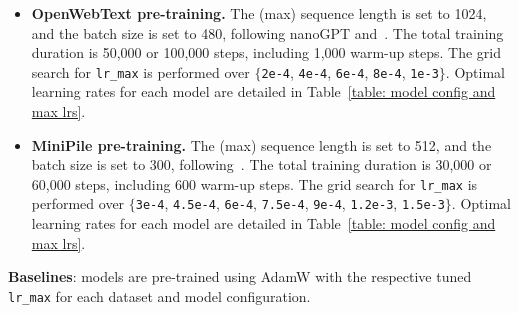 \begin{itemize}[leftmargin=2em]
    \item {\bf OpenWebText pre-training.} The (max) sequence length is set to 1024, and the batch size is set to 480, following nanoGPT and~\citet{liu2023sophia}. The total training duration is 50,000 or 100,000 steps, including 1,000 warm-up steps.
    The grid search for \texttt{lr\_max} is performed over $\{$\texttt{2e-4}, \texttt{4e-4}, \texttt{6e-4}, \texttt{8e-4}, \texttt{1e-3}$\}$. Optimal learning rates for each model are detailed in Table~\ref{table: model config and max lrs}.

    \item {\bf MiniPile pre-training.} The (max) sequence length is set to 512, and the batch size is set to 300, following~\citet{wang2024improving}. The total training duration is 30,000 or 60,000 steps, including 600 warm-up steps. The grid search for \texttt{lr\_max} is performed over $\{$\texttt{3e-4}, \texttt{4.5e-4}, \texttt{6e-4}, \texttt{7.5e-4}, \texttt{9e-4}, \texttt{1.2e-3}, \texttt{1.5e-3}$\}$. Optimal learning rates for each model are detailed in Table~\ref{table: model config and max lrs}.
\end{itemize}

{\bf Baselines}: models are pre-trained using AdamW with the respective tuned \texttt{lr\_max} for each dataset and model configuration.



